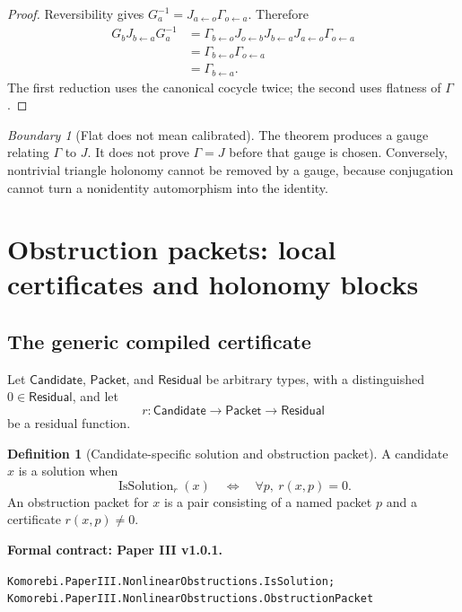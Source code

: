 \documentclass[11pt,a4paper]{article}
\theoremstyle{plain}
\theoremstyle{definition}
\newtheorem{definition}[definition]{Definition}
\theoremstyle{remark}
\newtheorem{boundary}[boundary]{Boundary}
\newcommand{\leanname}[1]{\nolinkurl{#1}}
\newcommand{\statusleanthree}[1]{\par\smallskip\noindent\begin{minipage}{\linewidth}{\color{leanblue}\textbf{Formal contract: Paper III v1.0.1.}}\par\begingroup\small\raggedright\leanname{#1}\par\endgroup\end{minipage}\par\smallskip}
\begin{document}
\begin{proof}
Reversibility gives
$G_a^{-1}=J_{a\leftarrow o}\Gamma_{o\leftarrow a}$.  Therefore
\[
\begin{aligned}
G_bJ_{b\leftarrow a}G_a^{-1}
&=
\Gamma_{b\leftarrow o}
J_{o\leftarrow b}J_{b\leftarrow a}
J_{a\leftarrow o}
\Gamma_{o\leftarrow a}\\
&=
\Gamma_{b\leftarrow o}\Gamma_{o\leftarrow a}\\
&=
\Gamma_{b\leftarrow a}.
\end{aligned}
\]
The first reduction uses the canonical cocycle twice; the second uses
flatness of $\Gamma$.
\end{proof}

\begin{boundary}[Flat does not mean calibrated]
The theorem produces a gauge relating $\Gamma$ to $J$.  It does not prove
$\Gamma=J$ before that gauge is chosen.  Conversely, nontrivial triangle
holonomy cannot be removed by a gauge, because conjugation cannot turn a
nonidentity automorphism into the identity.
\end{boundary}

\section{Obstruction packets: local certificates and holonomy blocks}
\label{sec:obstruction-packets}

\subsection{The generic compiled certificate}

Let $\mathsf{Candidate}$, $\mathsf{Packet}$, and $\mathsf{Residual}$ be
arbitrary types, with a distinguished
$0\in\mathsf{Residual}$, and let
\[
r:\mathsf{Candidate}\longrightarrow
\mathsf{Packet}\longrightarrow\mathsf{Residual}
\]
be a residual function.

\begin{definition}[Candidate-specific solution and obstruction packet]
\label{def:generic-obstruction}
A candidate $x$ is a solution when
\[
\operatorname{IsSolution}_r(x)
\quad\Longleftrightarrow\quad
\forall p,\ r(x,p)=0.
\]
An obstruction packet for $x$ is a pair consisting of a named packet $p$
and a certificate $r(x,p)\ne0$.
\end{definition}
\statusleanthree{Komorebi.PaperIII.NonlinearObstructions.IsSolution; Komorebi.PaperIII.NonlinearObstructions.ObstructionPacket}
\end{document}
